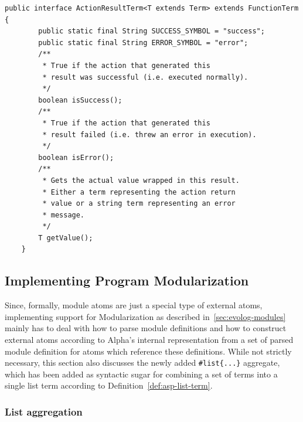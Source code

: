 \begin{lstlisting}[style=java, label={lst:implementation-actions-actionfunc}, caption={Java definition of an action result term.}]
    public interface ActionResultTerm<T extends Term> extends FunctionTerm {
        public static final String SUCCESS_SYMBOL = "success";
        public static final String ERROR_SYMBOL = "error";
        /**
         * True if the action that generated this 
         * result was successful (i.e. executed normally).
         */
        boolean isSuccess();
        /**
         * True if the action that generated this 
         * result failed (i.e. threw an error in execution).
         */
        boolean isError();
        /**
         * Gets the actual value wrapped in this result.
         * Either a term representing the action return 
         * value or a string term representing an error
         * message.
         */
        T getValue();
    }    
\end{lstlisting}   

\subsection{Implementing Program Modularization}

Since, formally, module atoms are just a special type of external atoms, implementing support for Modularization as described in~\ref{sec:evolog-modules} mainly has to deal with how to parse module definitions and how to construct external atoms according to Alpha's internal representation from a set of parsed module definition for atoms which reference these definitions. While not strictly necessary, this section also discusses the newly added \texttt{\#list\{...\}} aggregate, which has been added as syntactic sugar for combining a set of terms into a single list term according to Definition~\ref{def:asp-list-term}.

\subsubsection{List aggregation}

